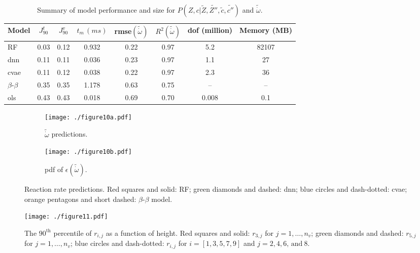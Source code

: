 \documentclass[review]{elsarticle}
\newcommand{\wt}[1]{\widetilde{#1}}
\begin{document}
\clearpage\newpage
\begin{table}[!tbp]
  \centering
  \begin{tabular}{lccccccc}
    \toprule
    Model & $J^t_{90}$ & $J^v_{90}$ & $t_m\,(\unit{ms})$ & \gls{rmse}$(\wt{\dot{\omega}})$& $R^2(\wt{\dot{\omega}})$ & \gls{dof} (million)& Memory (MB)\\
    \midrule
    RF            & 0.03 & 0.12 & 0.932 & 0.22 & 0.97 & 5.2 & 82107 \\
    \gls{dnn}     & 0.11 & 0.11 & 0.036 & 0.23 & 0.97 & 1.1 & 27 \\
    \gls{cvae}    & 0.11 & 0.12 & 0.038 & 0.22 & 0.97 & 2.3 & 36 \\
    $\beta$-$\beta$ & 0.35 & 0.35 & 1.178 & 0.63 & 0.75 & {--} & {--} \\
    \gls{ols}     & 0.43 & 0.43 & 0.018 & 0.69 & 0.70 & 0.008 & 0.1 \\
    \bottomrule
  \end{tabular}
  \caption{Summary of model performance and size for $P(Z,c | \wt{Z}, \wt{Z''}, \wt{c}, \wt{c''})$ and $\wt{\dot{\omega}}$.}\label{tab:summary}
\end{table}

\clearpage\newpage
\begin{figure}[!tbp]%
  \centering%
  \begin{subfigure}[t]{0.48\textwidth}%
    \texttt{[image: ./figure10a.pdf]}%
    \caption{$\wt{\dot{\omega}}$ predictions.}\label{fig:convolution_scatter}%
  \end{subfigure}\hfill%
  \begin{subfigure}[t]{0.48\textwidth}%
    \texttt{[image: ./figure10b.pdf]}%
    \caption{\gls{pdf} of $\epsilon(\wt{\dot{\omega}})$.}\label{fig:convolution_pdf}%
  \end{subfigure}%
  \caption{Reaction rate predictions. Red squares and solid: RF; green diamonds and dashed: \gls{dnn}; blue circles and dash-dotted: \gls{cvae}; orange pentagons and short dashed: $\beta$-$\beta$ model.}\label{fig:convolution}%
\end{figure}%

\clearpage\newpage
\begin{figure}[!tbp]%
  \centering%
  \texttt{[image: ./figure11.pdf]}\\%
  \caption{The $90^{\text{th}}$ percentile of $r_{i,j}$ as a function
    of height. Red squares and solid: $r_{3,j}$ for $j=1,\dots,n_v$;
    green diamonds and dashed: $r_{5,j}$ for $j=1,\dots,n_v$; blue
    circles and dash-dotted: $r_{i,j}$ for $i=[1,3,5,7,9]$ and
    $j=2,4,6,\,\text{and}\ 8$.}\label{fig:r90}%
\end{figure}%
\end{document}

